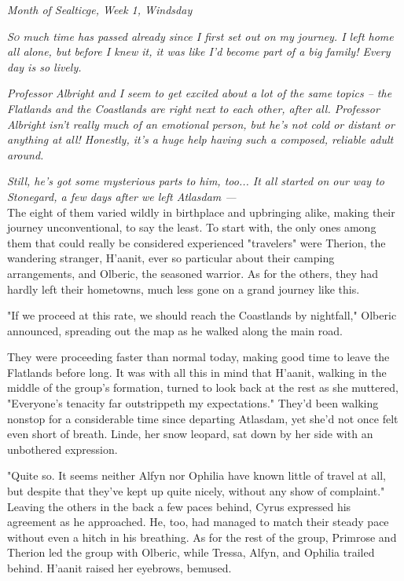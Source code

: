 \begin{flushright}\emph{Month of Sealticge, Week 1, Windsday}\end{flushright}


\emph{\textsc{So} much time has passed already since I first set out on my journey. I left home all alone, but before I knew it, it was like I'd become part of a big family! Every day is so lively.}

\emph{Professor Albright and I seem to get excited about a lot of the same topics -- the Flatlands and the Coastlands are right next to each other, after all. Professor Albright isn't really much of an emotional person, but he's not cold or distant or anything at all! Honestly, it's a huge help having such a composed, reliable adult around.}

\emph{Still, he's got some mysterious parts to him, too... It all started on our way to Stonegard, a few days after we left Atlasdam ---} 
\\

 The eight of them varied wildly in birthplace and upbringing alike, making their journey unconventional, to say the least. To start with, the only ones among them that could really be considered experienced "travelers" were Therion, the wandering stranger, H'aanit, ever so particular about their camping arrangements, and Olberic, the seasoned warrior. As for the others, they had hardly left their hometowns, much less gone on a grand journey like this. 

"If we proceed at this rate, we should reach the Coastlands by nightfall," Olberic announced, spreading out the map as he walked along the main road.

They were proceeding faster than normal today, making good time to leave the Flatlands before long. It was with all this in mind that H'aanit, walking in the middle of the group's formation, turned to look back at the rest as she muttered, "Everyone's tenacity far outstrippeth my expectations." They'd been walking nonstop for a considerable time since departing Atlasdam, yet she'd not once felt even short of breath. Linde, her snow leopard, sat down by her side with an unbothered expression.

"Quite so. It seems neither Alfyn nor Ophilia have known little of travel at all, but despite that they've kept up quite nicely, without any show of complaint." Leaving the others in the back a few paces behind, Cyrus expressed his agreement as he approached. He, too, had managed to match their steady pace without even a hitch in his breathing. As for the rest of the group, Primrose and Therion led the group with Olberic, while Tressa, Alfyn, and Ophilia trailed behind. H'aanit raised her eyebrows, bemused.

